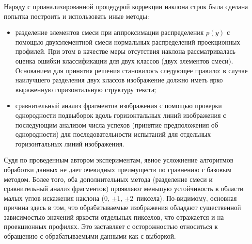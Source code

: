 \begin{multicols}{2}
      Наряду с проанализированной процедурой коррекции наклона строк была сделана 
попытка построить и использовать иные методы:
      \begin{itemize}
\item разделение элементов смеси при аппроксимации распределения $p(y)$ с 
помощью двухэлементной смеси нормальных распределений проекционных профилей. 
При этом в качестве меры отсутствия наклона рассматривалась оценка ошибки 
классификации для двух классов (двух элементов смеси). Основанием для принятия 
решения становилось следующее правило: в случае наилучшего разделения двух 
классов изображение должно иметь ярко выраженную горизонтальную структуру 
текста;
\item сравнительный анализ фрагментов изображения с помощью проверки 
однородности подвыборок вдоль горизонтальных линий изображения с последующим 
анализом числа успехов (принятие предположения об однородности) для 
последовательности испытаний для отдельных горизонтальных линий изображения.
\end{itemize}

      Судя по проведенным автором экспериментам, явное усложнение алгоритмов 
обработки данных не дает очевидных преимуществ по сравнению с базовым методом. 
Более того, оба дополнительных метода (разделение смеси и сравнительный анализ 
фрагментов) проявляют меньшую устойчивость в области малых углов искажения 
наклона (0, $\pm1$, $\pm 2$~пиксела). По-видимому, основная причина здесь в том, что 
обрабатываемые изображения обладают существенной зависимостью значений яркости 
отдельных пикселов, что отражается и на проекционных профилях. Это заставляет с 
осторожностью относиться к обращению с обрабатываемыми данными как с выборкой. 

\renewcommand{\figurename}{\protect\bf Таблица}
\setcounter{figure}{2}
\begin{figure*}[b]
\vspace*{2ex}

 \begin{center}
 \mbox{%
 \epsfxsize=154.663mm
 }
 \end{center}
 \vspace*{-9pt}
\end{figure*} 

\addtocounter{table}{1}

\renewcommand{\figurename}{\protect\bf Рис.}
\renewcommand{\tablename}{\protect\bf Таблица}


\end{multicols}
